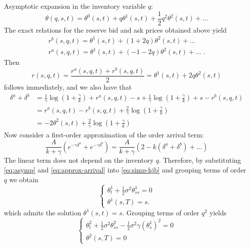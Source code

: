Asymptotic expansion in the inventory variable $q$:
\begin{equation}\label{eq:asymp}
    \theta(q,s,t)=\theta^0(s,t)+q\theta^1(s,t)+\frac{1}{2}q^2\theta^2(s,t)+...
\end{equation}
The exact relations for the reserve bid and ask prices obtained above yield
\begin{gather}
    r^b(s,q,t)=\theta^1(s,t)+(1+2q)\theta^2(s,t)+...\\
    r^a(s,q,t)=\theta^1(s,t)+(-1-2q)\theta^2(s,t)+...\;.
\end{gather}
Then
\begin{equation}\label{eq:reserve-price}
    r(s,q,t)=\frac{r^a(s,q,t)+r^b(s,q,t)}{2}=\theta^1(s,t)+2q\theta^2(s,t)
\end{equation}
follows immediately, and we also have that
\begin{equation}\label{eq:spread}
    \begin{aligned}
        \delta^a+\delta^b&=\frac{1}{\gamma}\log\left(1+\frac{\gamma}{k}\right)+r^a(s,q,t)-s+\frac{1}{\gamma}\log\left(1+\frac{\gamma}{k}\right)+s-r^b(s,q,t)\\
        &=r^a(s,q,t)-r^b(s,q,t)+\frac{2}{\gamma}\log\left(1+\frac{\gamma}{k}\right)\\
        &=-2\theta^2(s,t)+\frac{2}{\gamma}\log\left(1+\frac{\gamma}{k}\right)
    \end{aligned}
\end{equation}
Now consider a first-order approximation of the order arrival term:
\begin{equation}\label{eq:approx-arrival}
    \frac{A}{k+\gamma}(e^{-\gamma\delta^a}+e^{-\gamma\delta^b})=\frac{A}{k+\gamma}(2-k(\delta^a+\delta^b)+...)
\end{equation}
The linear term does not depend on the inventory $q$. Therefore, by substituting
\ref{eq:asymp} and \ref{eq:approx-arrival} into \ref{eq:simp-hjb} and 
grouping terms of order $q$ we obtain
\begin{equation}
    \begin{cases} 
        \theta^1_t+\frac{1}{2}\sigma^2\theta^1_{ss}=0\\
        \theta^1(s,T)=s.
    \end{cases}
\end{equation}
which admits the solution $\theta^1(s,t)=s$. Grouping terms of order $q^2$ yields
\begin{equation}
    \begin{cases}
        \theta^2_t+\frac{1}{2}\sigma^2\theta^2_{ss}-\frac{1}{2}\sigma^2\gamma(\theta^1_s)^2=0\\
        \theta^2(s,T)=0
    \end{cases}
\end{equation}

